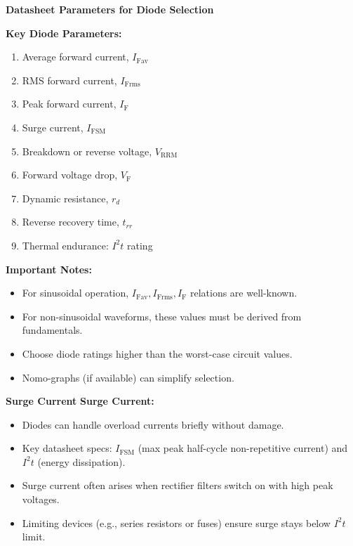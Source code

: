     \begin{frame}{\textbf{Datasheet Parameters for Diode Selection}}
    
    \textbf{Key Diode Parameters:}
    \begin{enumerate}
        \item Average forward current, $I_{\text{Fav}}$
        \item RMS forward current, $I_{\text{Frms}}$
        \item Peak forward current, $I_{\text{F}}$
        \item Surge current, $I_{\text{FSM}}$
        \item Breakdown or reverse voltage, $V_{\text{RRM}}$
        \item Forward voltage drop, $V_{\text{F}}$
        \item Dynamic resistance, $r_d$
        \item Reverse recovery time, $t_{rr}$
        \item Thermal endurance: $I^2t$ rating
    \end{enumerate}
    
    \textbf{Important Notes:}
    \begin{itemize}
        \item For sinusoidal operation, $I_{\text{Fav}}, I_{\text{Frms}}, I_{\text{F}}$ relations are well-known.
        \item For non-sinusoidal waveforms, these values must be derived from fundamentals.
        \item Choose diode ratings higher than the worst-case circuit values.
        \item Nomo-graphs (if available) can simplify selection.
    \end{itemize}
    
    \end{frame}
    
    \begin{frame}{\textbf{Surge Current}}
        \textbf{Surge Current:}
        \begin{itemize}
            \item Diodes can handle overload currents briefly without damage.
            \item Key datasheet specs: $I_{\text{FSM}}$ (max peak half-cycle non-repetitive current) and $I^2t$ (energy dissipation).
            \item Surge current often arises when rectifier filters switch on with high peak voltages.
            \item Limiting devices (e.g., series resistors or fuses) ensure surge stays below $I^2t$ limit.
        \end{itemize}
    \end{frame}
        

